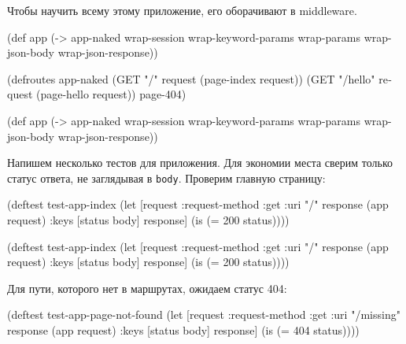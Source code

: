 Чтобы научить всему этому приложение, его оборачивают в middleware.

\begin{english}
  \begin{clojure}
(def app
  (-> app-naked
      wrap-session
      wrap-keyword-params
      wrap-params
      wrap-json-body
      wrap-json-response))
  \end{clojure}
\end{english}

\else

\begin{english}
  \begin{clojure}
(defroutes app-naked
  (GET "/"      request (page-index request))
  (GET "/hello" request (page-hello request))
  page-404)

(def app
  (-> app-naked
      wrap-session
      wrap-keyword-params
      wrap-params
      wrap-json-body
      wrap-json-response))
  \end{clojure}
\end{english}

\fi

Напишем несколько тестов для приложения. Для экономии места сверим только статус
ответа, не заглядывая в \verb|body|. Проверим главную страницу:

\ifnarrow

\begin{english}
  \begin{clojure}
(deftest test-app-index
  (let [request {:request-method :get
                 :uri "/"}
        response (app request)
        {:keys [status body]} response]
    (is (= 200 status))))
  \end{clojure}
\end{english}

\else

\begin{english}
  \begin{clojure}
(deftest test-app-index
  (let [request {:request-method :get :uri "/"}
        response (app request)
        {:keys [status body]} response]
    (is (= 200 status))))
  \end{clojure}
\end{english}

\fi

Для пути, которого нет в маршрутах, ожидаем статус 404:

\ifnarrow

\begin{english}
  \begin{clojure}
(deftest test-app-page-not-found
  (let [request {:request-method :get
                 :uri "/missing"}
        response (app request)
        {:keys [status body]} response]
    (is (= 404 status))))
  \end{clojure}
\end{english}

